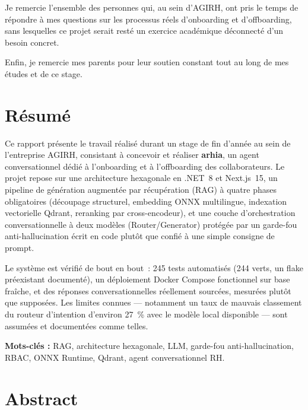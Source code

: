 \documentclass[12pt,a4paper]{article}
\begin{document}
Je remercie l'ensemble des personnes qui, au sein d'AGIRH, ont pris le temps de r\'epondre \`a mes questions sur les processus r\'eels d'onboarding et d'offboarding, sans lesquelles ce projet serait rest\'e un exercice acad\'emique d\'econnect\'e d'un besoin concret.

Enfin, je remercie mes parents pour leur soutien constant tout au long de mes \'etudes et de ce stage.

\newpage

\section*{R\'esum\'e}

Ce rapport pr\'esente le travail r\'ealis\'e durant un stage de fin d'ann\'ee au sein de l'entreprise AGIRH, consistant \`a concevoir et r\'ealiser \textbf{arhia}, un agent conversationnel dédié \`a l'onboarding et \`a l'offboarding des collaborateurs. Le projet repose sur une architecture hexagonale en .NET~8 et Next.js~15, un pipeline de g\'en\'eration augment\'ee par r\'ecup\'eration (RAG) \`a quatre phases obligatoires (d\'ecoupage structurel, embedding ONNX multilingue, indexation vectorielle Qdrant, reranking par cross-encodeur), et une couche d'orchestration conversationnelle \`a deux mod\`eles (Router/Generator) prot\'eg\'ee par un garde-fou anti-hallucination \'ecrit en code plut\^ot que confi\'e \`a une simple consigne de prompt.

Le syst\`eme est v\'erifi\'e de bout en bout~: 245 tests automatis\'es (244 verts, un flake pr\'eexistant document\'e), un d\'eploiement Docker Compose fonctionnel sur base fra\^iche, et des r\'eponses conversationnelles r\'eellement sourc\'ees, mesur\'ees plut\^ot que suppos\'ees. Les limites connues --- notamment un taux de mauvais classement du routeur d'intention d'environ 27~\% avec le mod\`ele local disponible --- sont assum\'ees et document\'ees comme telles.

\textbf{Mots-cl\'es :} RAG, architecture hexagonale, LLM, garde-fou anti-hallucination, RBAC, ONNX Runtime, Qdrant, agent conversationnel RH.

\vspace{4mm}
\section*{Abstract}
\end{document}
